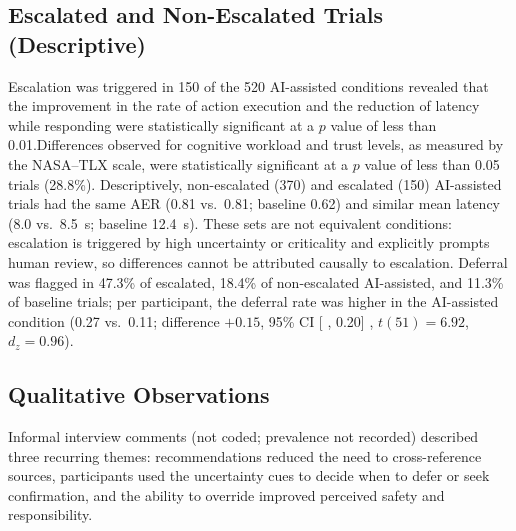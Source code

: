 \documentclass[journal]{IEEEtran}
\theoremstyle{plain}
\theoremstyle{definition}
\providecommand{\DIFaddtex}[1]{{\protect\color{blue} \sf #1}} %
\providecommand{\DIFdeltex}[1]{{\protect\color{red} \scriptsize #1}} %
\providecommand{\DIFaddbegin}{} %
\providecommand{\DIFaddend}{} %
\providecommand{\DIFdelbegin}{} %
\providecommand{\DIFdelend}{} %
\providecommand{\DIFadd}[1]{\texorpdfstring{\DIFaddtex{#1}}{#1}} %
\providecommand{\DIFdel}[1]{\texorpdfstring{\DIFdeltex{#1}}{}} %
\newcommand{\DIFscaledelfig}{0.5}
\newlength{\DIFdelgraphicswidth} %
\newlength{\DIFdelgraphicsheight} %
\newcommand{\DIFaddincludegraphics}[2][]{{\color{blue}\fbox{\DIFOincludegraphics[#1]{#2}}}} %
\newcommand{\DIFdelincludegraphics}[2][]{%
\sbox{\DIFdelgraphicsbox}{\DIFOincludegraphics[#1]{#2}}%
\settoboxwidth{\DIFdelgraphicswidth}{\DIFdelgraphicsbox} %
\settoboxtotalheight{\DIFdelgraphicsheight}{\DIFdelgraphicsbox} %
\scalebox{\DIFscaledelfig}{%
\parbox[b]{\DIFdelgraphicswidth}{\usebox{\DIFdelgraphicsbox}\\[-\baselineskip] \rule{\DIFdelgraphicswidth}{0em}}\llap{\resizebox{\DIFdelgraphicswidth}{\DIFdelgraphicsheight}{%
\setlength{\unitlength}{\DIFdelgraphicswidth}%
\begin{picture}(1,1)%
\thicklines\linethickness{2pt} %
{\color[rgb]{1,0,0}\put(0,0){\framebox(1,1){}}}%
{\color[rgb]{1,0,0}\put(0,0){\line( 1,1){1}}}%
{\color[rgb]{1,0,0}\put(0,1){\line(1,-1){1}}}%
\end{picture}%
}\hspace*{3pt}}} %
} %
\DeclareRobustCommand{\DIFaddbegin}{\DIFOaddbegin \let\includegraphics\DIFaddincludegraphics} %
\DeclareRobustCommand{\DIFaddend}{\DIFOaddend \let\includegraphics\DIFOincludegraphics} %
\DeclareRobustCommand{\DIFdelbegin}{\DIFOdelbegin \let\includegraphics\DIFdelincludegraphics} %
\DeclareRobustCommand{\DIFdelend}{\DIFOaddend \let\includegraphics\DIFOincludegraphics} %
\begin{document}
    \subsection{\DIFadd{Escalated and Non-Escalated Trials (Descriptive)}}
    \label{sec:res_escalation}
    \DIFadd{Escalation was triggered in 150 of the 520 }\DIFaddend AI-assisted \DIFdelbegin \DIFdel{conditions revealed that the improvement in the rate of action execution and the reduction of latency while responding were statistically significant at a $p$ value of less than 0.01.Differences observed for cognitive workload and trust levels, as measured by the NASA--TLX scale, were statistically significant at a $p$ value of less than 0.05}\DIFdelend \DIFaddbegin \DIFadd{trials (28.8\%). Descriptively, non-escalated (370) and escalated (150) AI-assisted trials had the same AER (0.81 vs.\ 0.81; baseline 0.62) and similar mean latency (8.0 vs.\ 8.5~s; baseline 12.4~s). These sets are not equivalent conditions: escalation is triggered by high uncertainty or criticality and explicitly prompts human review, so differences cannot be attributed causally to escalation. Deferral was flagged in 47.3\% of escalated, 18.4\% of non-escalated AI-assisted, and 11.3\% of baseline trials; per participant, the deferral rate was higher in the AI-assisted condition (0.27 vs.\ 0.11; difference $+0.15$, 95\% CI }[\DIFadd{0.11, 0.20}]\DIFadd{, $t(51)=6.92$, $d_z=0.96$).
}



    \subsection{\DIFadd{Qualitative Observations}}
    \DIFadd{Informal interview comments (not coded; prevalence not recorded) described three recurring themes: recommendations reduced the need to cross-reference sources, participants used the uncertainty cues to decide when to defer or seek confirmation, and the ability to override improved perceived safety and responsibility}\DIFaddend .

\end{document}
